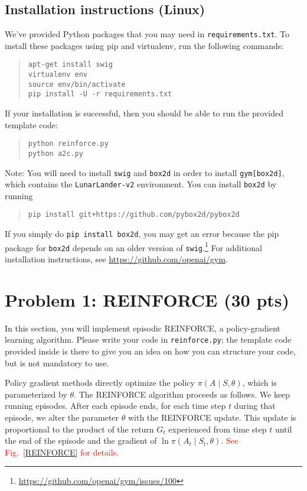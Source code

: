 \documentclass[12pt]{article}
\begin{document}
\subsection*{Installation instructions (Linux)}

We've provided Python packages that you may need in \texttt{requirements.txt}. To install these packages using pip and virtualenv, run the following commands:
\begin{quote}
\begin{verbatim}
apt-get install swig
virtualenv env
source env/bin/activate
pip install -U -r requirements.txt
\end{verbatim}
\end{quote}
If your installation is successful, then you should be able to run the provided template code:
\begin{quote}
\begin{verbatim}
python reinforce.py
python a2c.py
\end{verbatim}
\end{quote}

Note: You will need to install \texttt{swig} and \texttt{box2d} in order to install \texttt{gym[box2d]}, which contains the \texttt{LunarLander-v2} environment. You can install \texttt{box2d} by running
\begin{quote}
\texttt{pip install git+https://github.com/pybox2d/pybox2d}
\end{quote}
If you simply do \texttt{pip install box2d}, you may get an error because the pip package for \texttt{box2d} depends on an older version of \texttt{swig}.\footnote{\url{https://github.com/openai/gym/issues/100}} For additional installation instructions, see \url{https://github.com/openai/gym}.

\newpage
\section*{Problem 1: REINFORCE (30 pts)}

In this section, you will implement episodic REINFORCE, a policy-gradient learning algorithm. Please write your code in \texttt{reinforce.py}; the template code provided inside is there to give you an idea on how you can structure your code, but is not mandatory to use.

Policy gradient methods directly optimize the policy $\pi(A \mid S, \theta)$, which is parameterized by $\theta$. The REINFORCE algorithm proceeds as follows. We keep running episodes. After each episode ends, for each time step $t$ during that episode, we alter the parameter $\theta$ with the REINFORCE update. This update is proportional to the product of the return $G_t$ experienced from time step $t$ until the end of the episode and the gradient of $\ln \pi(A_t \mid S_t, \theta)$. \textcolor{red}{See Fig.~\ref{REINFORCE} for details}.
\end{document}
